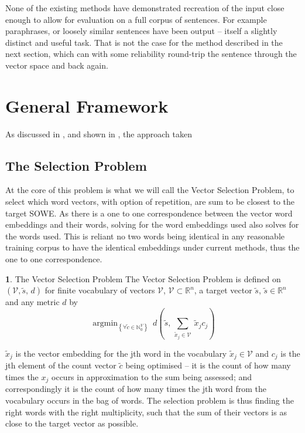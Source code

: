 \documentclass[11pt]{article}
\numberwithin{equation}{section}
\numberwithin{figure}{section}
\theoremstyle{plain}
\theoremstyle{definition}
\newtheorem{defn}[thm]{\protect\definitionname}
\providecommand{\definitionname}{Definition}
\DeclareMathOperator*{\argmin}{argmin}
\begin{document}
None of the existing methods have demonstrated recreation of the input close enough to allow for evaluation on a full corpus of sentences. For example paraphrases, or loosely similar sentences have been output -- itself a slightly distinct and useful task. That is not the case for the method described in the next section, which can with some reliability round-trip the sentence through the vector space and back again.


\section{General Framework}\label{framework}
As discussed in , and shown in , the approach taken 

\subsection{The Selection Problem}

At the core of this problem is what we will call the Vector Selection Problem, to select which word vectors, with option of repetition, are sum to be closest to the target SOWE.
As there is a one to one correspondence between the vector word embeddings and their words, solving for the word embeddings used also solves for the words used. This is reliant no two words being identical in any reasonable training corpus to have the identical embeddings under current methods, thus the one to one correspondence.

\renewcommand{\c}{\tilde{c}}
\newcommand{\s}{\tilde{s}}
\newcommand{\x}{\tilde{x}}
\renewcommand{\t}{\tilde{t}}
\newcommand{\N}{\mathbb{N}}
\newcommand{\R}{\mathbb{R}}
\newcommand{\V}{\mathcal{V}}

\begin{defn}{The Vector Selection Problem}
	The Vector Selection Problem is defined on $(\V, \s,\,d)$ for finite vocabulary of vectors $\V$, $\V\subset{\R}^{n}$, a target vector $ \s$, $ \s\in\R^{n}$ and any metric $d$ by
		\[
		\argmin_{\left\{ \forall\c\in\N_{0}^{V}\right\} }\:d( \s,\,\sum_{\x_j\in\V}\:\x_{j}c_{j})
		\]
						
		$\x_{j}$ is the vector embedding for the jth word in the vocabulary
		$\x_{j}\in\V$ and $c_j$ is the jth element of the count vector $\c$ being optimised -- it is the count of how many times the $x_j$ occurs in approximation to the sum being assessed; and correspondingly it is the count of how many times the jth word from the vocabulary occurs in the bag of words.
		The selection problem is thus finding the right words with the right multiplicity, such that the sum of their vectors is as close to the target vector as possible.
\end{defn}
\end{document}
